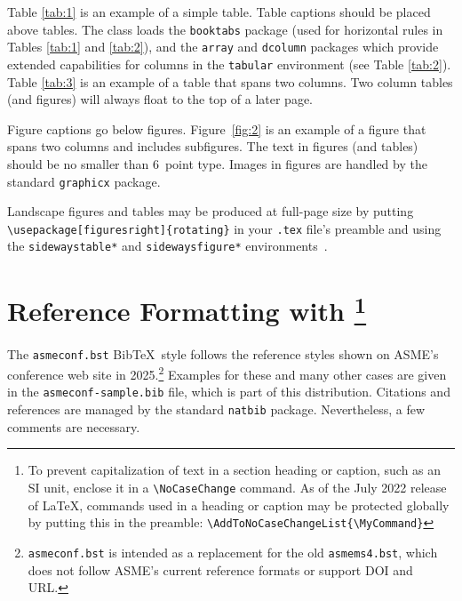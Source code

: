 \documentclass[colorlinks,upint,subscriptcorrection,varvw,hyphenate,balance,greek,russian,vietnamese,german]{asmeconf} %
\newcommand*\BibTeX{Bib\TeX}
\begin{document}
Table \ref{tab:1} is an example of a simple table. Table captions should be placed above tables.
The class loads the \texttt{booktabs} package (used for horizontal rules in Tables \ref{tab:1} and \ref{tab:2}), and the \texttt{array} and \texttt{dcolumn} packages which provide extended capabilities for columns in the \texttt{tabular} environment (see Table \ref{tab:2}).  Table \ref{tab:3} is an example of a table that spans two columns. Two column tables (and figures) will always float to the top of a later page.

Figure captions go below figures. Figure~\ref{fig:2} is an example of a figure that spans two columns and includes subfigures. The text in figures (and tables) should be no smaller than 6~point type. Images in figures are handled by the standard \texttt{graphicx} package.

Landscape figures and tables may be produced at full-page size by putting \verb|\usepackage[figuresright]{rotating}| in your \texttt{.tex} file's preamble and using the \texttt{sidewaystable*} and \texttt{sidewaysfigure*} environments~\cite{fairbairns}.



\section{Reference Formatting with \footnote{To prevent capitalization of text in a section heading or caption, such as an SI unit, enclose it in a \texttt{\textbackslash NoCaseChange} command. As of the July 2022 release of \LaTeX, commands used in a heading or caption may be protected globally by putting this in the preamble: \texttt{\textbackslash AddToNoCaseChangeList\{\textbackslash MyCommand\}}}}\label{sec:references}

The {\upshape\texttt{asmeconf.bst}} \BibTeX\   style follows the reference styles shown on ASME's conference web site in  2025.\footnote{\texttt{asmeconf.bst} is intended as a replacement for the old \texttt{asmems4.bst}, which does not follow ASME's current reference formats or support DOI and URL.}
Examples for these and many other cases are given in the \texttt{asmeconf-sample.bib} file, which is part of this distribution. Citations and references are managed by the standard \texttt{natbib} package.  Nevertheless, a few comments are necessary. 

\end{document}
